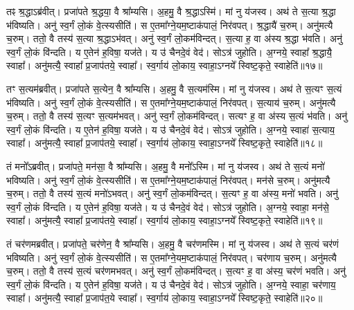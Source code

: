    तꣴ श्र॒द्धाऽब्र॑वीत्।
   प्रजा॑पते श्र॒द्धया॒ वै श्रा᳚म्यसि।
   अ॒हमु॒ वै श्र॒द्धाऽस्मि॑।
   मां नु य॑जस्व।
   अथ॑ ते स॒त्या श्र॒द्धा भ॑विष्यति।
   अनु॑ स्व॒र्गं लो॒कं वे॒त्स्यसीति॑।
   स ए॒तमा᳚ग्ने॒यम॒ष्टाक॑पालं॒ निर॑वपत्।
   श्र॒द्धायै॑ च॒रुम्।
   अनु॑मत्यै च॒रुम्।
   ततो॒ वै तस्य॑ स॒त्या श्र॒द्धाऽभ॑वत्।
   अनु॑ स्व॒र्गं लो॒कम॑विन्दत्।
   स॒त्या ह॒ वा अ॑स्य श्र॒द्धा भ॑वति।
   अनु॑ स्व॒र्गं लो॒कं वि॑न्दति।
   य ए॒तेन॑ ह॒विषा॒ यज॑ते।
   य उ॑ चैनदे॒वं वेद॑।
   सोऽत्र॑ जुहोति।
   अ॒ग्नये॒ स्वाहा᳚ श्र॒द्धायै॒ स्वाहा᳚।
   अनु॑मत्यै॒ स्वाहा᳚ प्र॒जाप॑तये॒ स्वाहा᳚।
   स्व॒र्गाय॑ लो॒काय॒ स्वाहा॒ऽग्नये᳚ स्विष्ट॒कृते॒ स्वाहेति॑॥१७॥

   तꣳ स॒त्यम॑ब्रवीत्।
   प्रजा॑पते स॒त्येन॒ वै श्रा᳚म्यसि।
   अ॒हमु॒ वै स॒त्यम॑स्मि।
   मां नु य॑जस्व।
   अथ॑ ते स॒त्यꣳ स॒त्यं भ॑विष्यति।
   अनु॑ स्व॒र्गं लो॒कं वे॒त्स्यसीति॑।
   स ए॒तमा᳚ग्ने॒यम॒ष्टाक॑पालं॒ निर॑वपत्।
   स॒त्याय॑ च॒रुम्।
   अनु॑मत्यै च॒रुम्।
   ततो॒ वै तस्य॑ स॒त्यꣳ स॒त्यम॑भवत्।
   अनु॑ स्व॒र्गं लो॒कम॑विन्दत्।
   सत्यꣳ ह॒ वा अ॑स्य स॒त्यं भ॑वति।
   अनु॑ स्व॒र्गं लो॒कं वि॑न्दति।
   य ए॒तेन॑ ह॒विषा॒ यज॑ते।
   य उ॑ चैनदे॒वं वेद॑।
   सोऽत्र॑ जुहोति।
   अ॒ग्नये॒ स्वाहा॑ स॒त्याय॒ स्वाहा᳚।
   अनु॑मत्यै॒ स्वाहा᳚ प्र॒जाप॑तये॒ स्वाहा᳚।
   स्व॒र्गाय॑ लो॒काय॒ स्वाहा॒ऽग्नये᳚ स्विष्ट॒कृते॒ स्वाहेति॑॥१८॥

   तं मनो᳚ऽब्रवीत्।
   प्रजा॑पते॒ मन॑सा॒ वै श्रा᳚म्यसि।
   अ॒हमु॒ वै मनो᳚ऽस्मि।
   मां नु य॑जस्व।
   अथ॑ ते स॒त्यं मनो॑ भविष्यति।
   अनु॑ स्व॒र्गं लो॒कं वे॒त्स्यसीति॑।
   स ए॒तमा᳚ग्ने॒यम॒ष्टाक॑पालं॒ निर॑वपत्।
   मन॑से च॒रुम्।
   अनु॑मत्यै च॒रुम्।
   ततो॒ वै तस्य॑ स॒त्यं मनो॑ऽभवत्।
   अनु॑ स्व॒र्गं लो॒कम॑विन्दत्।
   स॒त्यꣳ ह॒ वा अ॑स्य॒ मनो॑ भवति।
   अनु॑ स्व॒र्गं लो॒कं वि॑न्दति।
   य ए॒तेन॑ ह॒विषा॒ यज॑ते।
   य उ॑ चैनदे॒वं वेद॑।
   सोऽत्र॑ जुहोति।
   अ॒ग्नये॒ स्वाहा॒ मन॑से॒ स्वाहा᳚।
   अनु॑मत्यै॒ स्वाहा᳚ प्र॒जाप॑तये॒ स्वाहा᳚।
   स्व॒र्गाय॑ लो॒काय॒ स्वाहा॒ऽग्नये᳚ स्विष्ट॒कृते॒ स्वाहेति॑॥१९॥

   तं चर॑णमब्रवीत्।
   प्रजा॑पते॒ चर॑णेन॒ वै श्रा᳚म्यसि।
   अ॒हमु॒ वै चर॑णमस्मि।
   मां नु य॑जस्व।
   अथ॑ ते स॒त्यं चर॑णं भविष्यति।
   अनु॑ स्व॒र्गं लो॒कं वे॒त्स्यसीति॑।
   स ए॒तमा᳚ग्ने॒यम॒ष्टाक॑पालं॒ निर॑वपत्।
   चर॑णाय च॒रुम्।
   अनु॑मत्यै च॒रुम्।
   ततो॒ वै तस्य॑ स॒त्यं चर॑णमभवत्।
   अनु॑ स्व॒र्गं लो॒कम॑विन्दत्।
   स॒त्यꣳ ह॒ वा अ॑स्य॒ चर॑णं भवति।
   अनु॑ स्व॒र्गं लो॒कं वि॑न्दति।
   य ए॒तेन॑ ह॒विषा॒ यज॑ते।
   य उ॑ चैनदे॒वं वेद॑।
   सोऽत्र॑ जुहोति।
   अ॒ग्नये॒ स्वाहा॒ चर॑णाय॒ स्वाहा᳚।
   अनु॑मत्यै॒ स्वाहा᳚ प्र॒जाप॑त॒ये स्वाहा᳚।
   स्व॒र्गाय॑ लो॒काय॒ स्वाहा॒ऽग्नये᳚ स्विष्ट॒कृते॒ स्वाहेति॑॥२०॥

